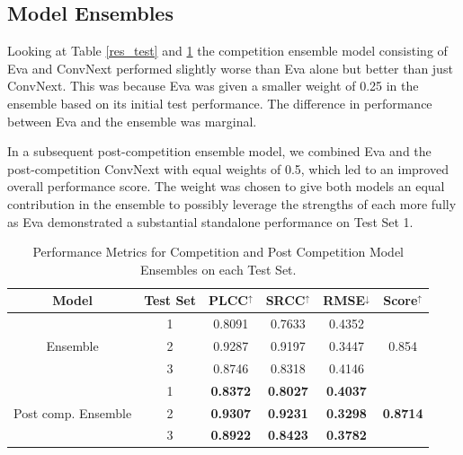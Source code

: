 \documentclass[a4paper,12pt,openright]{book}
\begin{document}
\subsection{Model Ensembles}

Looking at Table \ref{res_test} and \ref{res_ensemble} the competition ensemble model consisting of Eva and ConvNext performed slightly worse than Eva alone but better than just ConvNext. This was because Eva was given a smaller weight of 0.25 in the ensemble based on its initial test performance. The difference in performance between Eva and the ensemble was marginal.

In a subsequent post-competition ensemble model, we combined Eva and the post-competition ConvNext with equal weights of 0.5, which led to an improved overall performance score. The weight was chosen to give both models an equal contribution in the ensemble to possibly leverage the strengths of each more fully as Eva demonstrated a substantial standalone performance on Test Set 1.
\begin{table}[h]

\smallskip
\begin{center}
\begin{tabular}{ | c | c | c | c | c | c | }
\hline  
  \textbf{Model} & \textbf{Test Set} & \textbf{PLCC$^{\uparrow}$} & \textbf{SRCC$^{\uparrow}$} & \textbf{RMSE$^{\downarrow}$} &
  \textbf{Score$^{\uparrow}$}\\ 

\hline

  \multirow{3}{*}{Ensemble} & 1 & 0.8091 & 0.7633 & 0.4352 & \multirow{3}{*}{0.854} \\
                            & 2 & 0.9287 &
                            0.9197 & 0.3447  & \\
                            & 3 & 0.8746 & 0.8318& 0.4146 & \\
                            \hline


  \multirow{3}{*}{Post comp. Ensemble} & 1 & \textbf{0.8372} & \textbf{0.8027} & \textbf{0.4037} & \multirow{3}{*}{\textbf{0.8714}} \\
                            & 2 &  \textbf{0.9307} & \textbf{0.9231} & \textbf{0.3298}  & \\
                            & 3 & \textbf{ 0.8922} & \textbf{0.8423} & \textbf{0.3782} & \\
\hline  
\end{tabular}
\end{center}
\caption{Performance Metrics for Competition and Post Competition Model Ensembles on each Test Set.}
\label{res_ensemble}
\end{table}
\newpage
\end{document}
